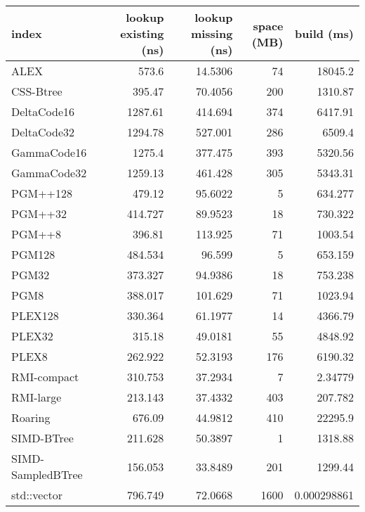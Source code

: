 \begin{tabular}{lrrrr}
\hline
 index             &   lookup existing (ns) &   lookup missing (ns) &   space (MB) &      build (ms) \\
\hline
 ALEX              &                573.6   &               14.5306 &           74 & 18045.2         \\
 CSS-Btree         &                395.47  &               70.4056 &          200 &  1310.87        \\
 DeltaCode16       &               1287.61  &              414.694  &          374 &  6417.91        \\
 DeltaCode32       &               1294.78  &              527.001  &          286 &  6509.4         \\
 GammaCode16       &               1275.4   &              377.475  &          393 &  5320.56        \\
 GammaCode32       &               1259.13  &              461.428  &          305 &  5343.31        \\
 PGM++128          &                479.12  &               95.6022 &            5 &   634.277       \\
 PGM++32           &                414.727 &               89.9523 &           18 &   730.322       \\
 PGM++8            &                396.81  &              113.925  &           71 &  1003.54        \\
 PGM128            &                484.534 &               96.599  &            5 &   653.159       \\
 PGM32             &                373.327 &               94.9386 &           18 &   753.238       \\
 PGM8              &                388.017 &              101.629  &           71 &  1023.94        \\
 PLEX128           &                330.364 &               61.1977 &           14 &  4366.79        \\
 PLEX32            &                315.18  &               49.0181 &           55 &  4848.92        \\
 PLEX8             &                262.922 &               52.3193 &          176 &  6190.32        \\
 RMI-compact       &                310.753 &               37.2934 &            7 &     2.34779     \\
 RMI-large         &                213.143 &               37.4332 &          403 &   207.782       \\
 Roaring           &                676.09  &               44.9812 &          410 & 22295.9         \\
 SIMD-BTree        &                211.628 &               50.3897 &            1 &  1318.88        \\
 SIMD-SampledBTree &                156.053 &               33.8489 &          201 &  1299.44        \\
 std::vector       &                796.749 &               72.0668 &         1600 &     0.000298861 \\
\hline
\end{tabular}